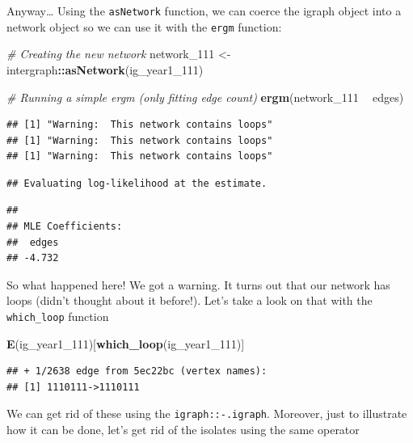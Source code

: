 \documentclass[]{book}
\newenvironment{Shaded}{\begin{snugshade}}{\end{snugshade}}
\newcommand{\KeywordTok}[1]{\textcolor[rgb]{0.13,0.29,0.53}{\textbf{#1}}}
\newcommand{\DecValTok}[1]{\textcolor[rgb]{0.00,0.00,0.81}{#1}}
\newcommand{\StringTok}[1]{\textcolor[rgb]{0.31,0.60,0.02}{#1}}
\newcommand{\CommentTok}[1]{\textcolor[rgb]{0.56,0.35,0.01}{\textit{#1}}}
\newcommand{\OperatorTok}[1]{\textcolor[rgb]{0.81,0.36,0.00}{\textbf{#1}}}
\newcommand{\NormalTok}[1]{#1}
\theoremstyle{definition}
\theoremstyle{definition}
\theoremstyle{definition}
\theoremstyle{remark}
\begin{document}
Anyway\ldots{} Using the \texttt{asNetwork} function, we can coerce the
igraph object into a network object so we can use it with the
\texttt{ergm} function:

\begin{Shaded}
\begin{Highlighting}[]
\CommentTok{# Creating the new network}
\NormalTok{network_}\DecValTok{111}\NormalTok{ <-}\StringTok{ }\NormalTok{intergraph}\OperatorTok{::}\KeywordTok{asNetwork}\NormalTok{(ig_year1_}\DecValTok{111}\NormalTok{)}

\CommentTok{# Running a simple ergm (only fitting edge count)}
\KeywordTok{ergm}\NormalTok{(network_}\DecValTok{111} \OperatorTok{~}\StringTok{ }\NormalTok{edges)}
\end{Highlighting}
\end{Shaded}

\begin{verbatim}
## [1] "Warning:  This network contains loops"
## [1] "Warning:  This network contains loops"
## [1] "Warning:  This network contains loops"
\end{verbatim}

\begin{verbatim}
## Evaluating log-likelihood at the estimate.
\end{verbatim}

\begin{verbatim}
## 
## MLE Coefficients:
##  edges  
## -4.732
\end{verbatim}

So what happened here! We got a warning. It turns out that our network
has loops (didn't thought about it before!). Let's take a look on that
with the \texttt{which\_loop} function

\begin{Shaded}
\begin{Highlighting}[]
\KeywordTok{E}\NormalTok{(ig_year1_}\DecValTok{111}\NormalTok{)[}\KeywordTok{which_loop}\NormalTok{(ig_year1_}\DecValTok{111}\NormalTok{)]}
\end{Highlighting}
\end{Shaded}

\begin{verbatim}
## + 1/2638 edge from 5ec22bc (vertex names):
## [1] 1110111->1110111
\end{verbatim}

We can get rid of these using the \texttt{igraph::-.igraph}. Moreover,
just to illustrate how it can be done, let's get rid of the isolates
using the same operator
\end{document}
